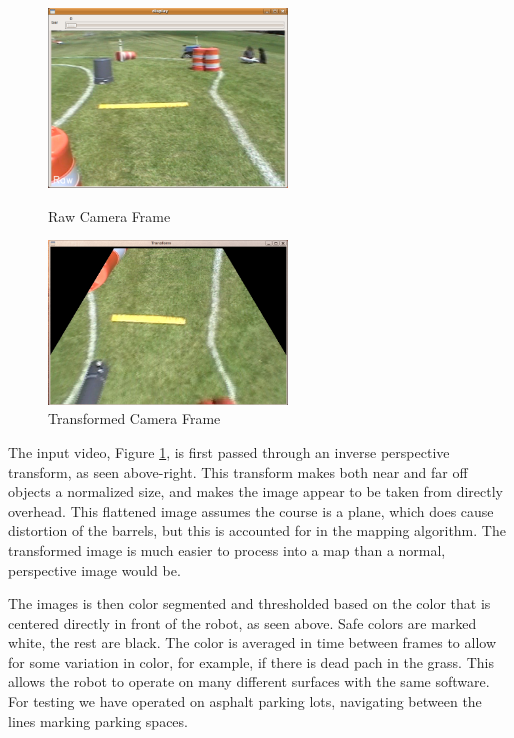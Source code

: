 \begin{figure}[H]
\begin{minipage}[b]{0.5\linewidth}
\centering
\includegraphics[width=2.5in]{./pics/raw.png}
\caption{Raw Camera Frame}
\label{FIG:Raw}
\end{minipage}
\hspace{0.1in}
\begin{minipage}[b]{0.5\linewidth}
\centering
\includegraphics[width=2.5in]{./pics/trans.png}
\caption{Transformed Camera Frame}
\label{FIG:Raw}
\end{minipage}
\end{figure}

The input video, Figure \ref{FIG:Raw}, is first passed through an inverse perspective transform, as seen above-right. This transform makes both near and far off objects a normalized size, and makes the image appear to be taken from directly overhead. This flattened image assumes the course is a plane, which does cause distortion of the barrels, but this is accounted for in the mapping algorithm. The transformed image is much easier to process into a map than a normal, perspective image would be.

The images is then color segmented and thresholded based on the color that is centered directly in front of the robot, as seen above. Safe colors are marked white, the rest are black. The color is averaged in time between frames to allow for some variation in color, for example, if there is dead pach in the grass. This allows the robot to operate on many different surfaces with the same software. For testing we have operated on asphalt parking lots, navigating between the lines marking parking spaces.

